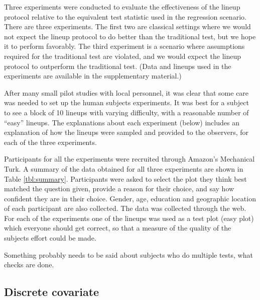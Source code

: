 \documentclass{article}
\newcommand{\green}[1]{{\color{green} #1}} %
\begin{document}
Three experiments were conducted to evaluate the effectiveness of the lineup protocol relative to the equivalent test statistic used in the regression scenario. There are three experiments. The first two are classical settings where we would not expect the lineup protocol to do better than the traditional test, but we hope it to perform favorably. The third experiment is a scenario where assumptions required for the traditional test are violated, and we would expect the lineup protocol to outperform the traditional test. (Data and lineups used in the experiments are available in the supplementary material.)

After many small pilot studies with local personnel, it was clear that some care was needed to set up the human subjects experiments. It was best for a subject to see a block of 10 lineups with varying difficulty, with a reasonable number of ``easy'' lineups. The explanations about each experiment (below) includes an explanation of how the lineups were sampled and provided to the observers, for each of the three experiments.

Participants for all the experiments were recruited through \cite{turk} Amazon's Mechanical Turk. A summary of the data obtained for all three experiments are shown in Table \ref{tbl:summary}. Participants were asked to select the plot they think best matched the question given, provide a reason for their choice, and say how confident they are in their choice. Gender, age, education and geographic location of each participant are also collected. The data was collected through the web. For each of the experiments one of the lineups was used as a test plot (easy plot) which everyone should get correct, so that a measure of the quality of the subjects effort could be made. 

\green{Something probably needs to be said about subjects who do multiple tests, what checks are done.}

\subsection{Discrete covariate}\label{sec:category}
\end{document}

